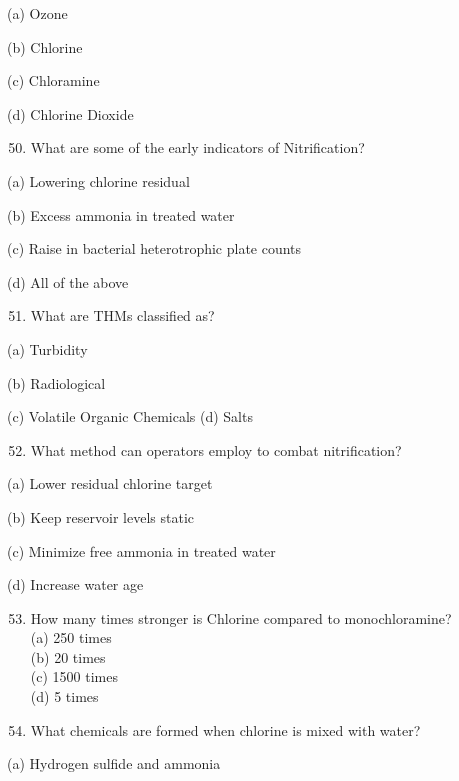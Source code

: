 \documentclass[10pt]{article}
\begin{document}
\begin{enumerate}
\begin{enumerate}
(a) Ozone

(b) Chlorine

(c) Chloramine

(d) Chlorine Dioxide

\begin{enumerate}
  \setcounter{enumi}{49}
  \item What are some of the early indicators of Nitrification?
\end{enumerate}

(a) Lowering chlorine residual

(b) Excess ammonia in treated water

(c) Raise in bacterial heterotrophic plate counts

(d) All of the above

\begin{enumerate}
  \setcounter{enumi}{50}
  \item What are THMs classified as?
\end{enumerate}

(a) Turbidity

(b) Radiological

(c) Volatile Organic Chemicals (d) Salts

\begin{enumerate}
  \setcounter{enumi}{51}
  \item What method can operators employ to combat nitrification?
\end{enumerate}

(a) Lower residual chlorine target

(b) Keep reservoir levels static

(c) Minimize free ammonia in treated water

(d) Increase water age

\begin{enumerate}
  \setcounter{enumi}{52}
  \item How many times stronger is Chlorine compared to monochloramine?\\
(a) 250 times\\
(b) 20 times\\
(c) 1500 times\\
(d) 5 times

  \item What chemicals are formed when chlorine is mixed with water?

\end{enumerate}

(a) Hydrogen sulfide and ammonia


\end{enumerate}
\end{enumerate}
\end{document}
